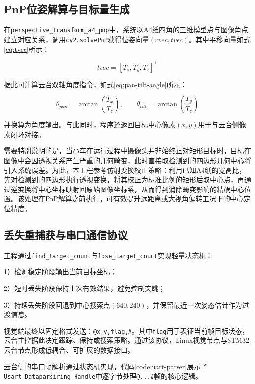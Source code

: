 \subsection{PnP位姿解算与目标量生成}

在\texttt{perspective\_transform\_a4\_pnp}中，系统以A4纸四角的三维模型点与图像角点建立对应关系，调用\texttt{cv2.solvePnP}获得位姿向量\((rvec,tvec)\)。其中平移向量如式\eqref{eq:tvec}所示：

\begin{equation}
tvec=[T_x,T_y,T_z]^\top
\label{eq:tvec}
\end{equation}

据此可计算云台双轴角度指令，如式\eqref{eq:pan-tilt-angle}所示：

\begin{equation}
\theta_{pan}=\arctan\!\left(\frac{T_x}{T_z}\right),\qquad
\theta_{tilt}=\arctan\!\left(\frac{T_y}{T_z}\right)
\label{eq:pan-tilt-angle}
\end{equation}

并换算为角度输出。与此同时，程序还返回目标中心像素\((x,y)\)用于与云台侧像素闭环对接。

需要特别说明的是，当小车在运行过程中摄像头并非始终正对矩形目标时，目标在图像中会因透视关系产生严重的几何畸变，此时直接取检测到的四边形几何中心将引入系统误差。为此，本工程参考仿射变换校正策略：利用已知A4纸的宽高比，先对检测到的四边形执行透视变换，将其校正为标准比例的矩形后取中心点，再通过逆变换将中心坐标映射回原始图像坐标系，从而得到消除畸变影响的精确中心位置。该处理在PnP解算之前执行，可有效提升远距离或大视角偏转工况下的中心定位精度。

\subsection{丢失重捕获与串口通信协议}

工程通过\texttt{find\_target\_count}与\texttt{lose\_target\_count}实现轻量状态机：

1）检测稳定阶段输出当前目标坐标；

2）短时丢失阶段保持上次有效结果，避免控制突跳；

3）持续丢失阶段回退到中心搜索点\((640,240)\)，并保留最近一次姿态估计作为过渡信息。

视觉端最终以固定格式发送：\texttt{@x,y,flag,\#}。其中\texttt{flag}用于表征当前帧目标状态，云台主控据此决定跟踪、保持或搜索策略。通过该协议，Linux视觉节点与STM32云台节点形成低耦合、可扩展的数据接口。

云台侧的串口帧解析通过状态机实现，代码\ref{code:uart-parser}展示了\texttt{Usart\_Dataparsiring\_Handle}中逐字节处理\texttt{@...{\#}}帧的核心逻辑。

